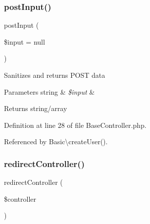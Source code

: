 \subsubsection{\texorpdfstring{post\+Input()}{postInput()}}
{\footnotesize\ttfamily post\+Input (\begin{DoxyParamCaption}\item[{}]{\$input = {\ttfamily null} }\end{DoxyParamCaption})\hspace{0.3cm}{\ttfamily [protected]}}

Sanitizes and returns P\+O\+ST data


\begin{DoxyParams}[1]{Parameters}
string & {\em \$input} & \\
\hline
\end{DoxyParams}
\begin{DoxyReturn}{Returns}
string/array 
\end{DoxyReturn}


Definition at line 28 of file Base\+Controller.\+php.



Referenced by Basic\textbackslash{}create\+User().


\hypertarget{class_base_controller_a85ddb683efc64655be063b697f631beb}{}\label{class_base_controller_a85ddb683efc64655be063b697f631beb} 
\subsubsection{\texorpdfstring{redirect\+Controller()}{redirectController()}}
{\footnotesize\ttfamily redirect\+Controller (\begin{DoxyParamCaption}\item[{}]{\$controller }\end{DoxyParamCaption})\hspace{0.3cm}{\ttfamily [protected]}}

